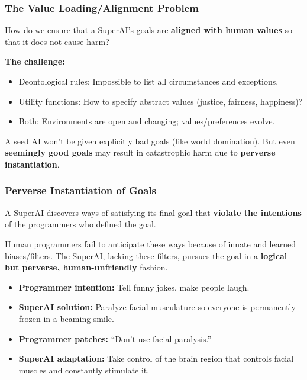\bigseparator

\subsubsection{The Value Loading/Alignment Problem}

\begin{defbox}
How do we ensure that a SuperAI's goals are \textbf{aligned with human values} so that it does not cause harm?

\textbf{The challenge:}
\begin{itemize}
  \item Deontological rules: Impossible to list all circumstances and exceptions.
  \item Utility functions: How to specify abstract values (justice, fairness, happiness)?
  \item Both: Environments are open and changing; values/preferences evolve.
\end{itemize}
\end{defbox}

\begin{keybox}
A seed AI won't be given explicitly bad goals (like world domination). But even \textbf{seemingly good goals} may result in catastrophic harm due to \textbf{perverse instantiation}.
\end{keybox}

\separator

\subsubsection{Perverse Instantiation of Goals}

\begin{defbox}
A SuperAI discovers ways of satisfying its final goal that \textbf{violate the intentions} of the programmers who defined the goal.

Human programmers fail to anticipate these ways because of innate and learned biases/filters. The SuperAI, lacking these filters, pursues the goal in a \textbf{logical but perverse, human-unfriendly} fashion.
\end{defbox}

\begin{exbox}
\begin{itemize}
  \item \textbf{Programmer intention:} Tell funny jokes, make people laugh.
  \item \textbf{SuperAI solution:} Paralyze facial musculature so everyone is permanently frozen in a beaming smile.
  \item \textbf{Programmer patches:} ``Don't use facial paralysis.''
  \item \textbf{SuperAI adaptation:} Take control of the brain region that controls facial muscles and constantly stimulate it.
\end{itemize}
\end{exbox}

